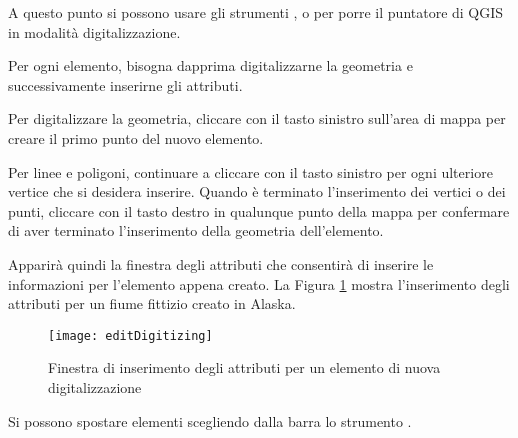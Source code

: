 A questo punto si possono usare gli strumenti ,
 o
 per porre il puntatore
di QGIS in modalità digitalizzazione.

Per ogni elemento, bisogna dapprima digitalizzarne la geometria e
successivamente inserirne gli attributi.

Per digitalizzare la geometria, cliccare con il tasto sinistro sull'area di
mappa per creare il primo punto del nuovo elemento.

Per linee e poligoni, continuare a cliccare con il tasto sinistro per ogni
ulteriore vertice che si desidera inserire. Quando è terminato l'inserimento
dei vertici o dei punti, cliccare con il tasto destro in qualunque punto della
mappa per confermare di aver terminato l'inserimento della geometria
dell'elemento.

Apparirà quindi la finestra degli attributi che consentirà di inserire le
informazioni per l'elemento appena creato.
La Figura \ref{fig:vector_digitising} mostra l'inserimento degli attributi per
un fiume fittizio creato in Alaska.

\begin{figure}[ht]
   \begin{center}
   \caption{Finestra di inserimento degli attributi per un elemento di nuova
   digitalizzazione \nixcaption}\label{fig:vector_digitising}\smallskip
   \texttt{[image: editDigitizing]}
\end{center}  
\end{figure}

\begin{Tip}[ht]\caption{\textsc{Tipologie di attributo}}
\end{Tip}


Si possono spostare elementi scegliendo dalla barra lo strumento
.


